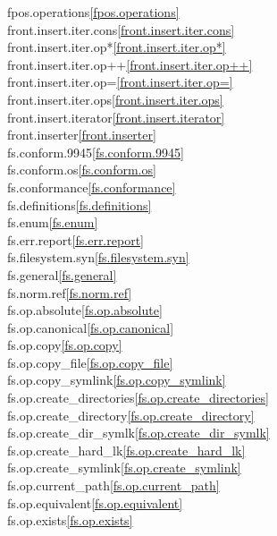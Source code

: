 \begin{multicols}{2}
fpos.operations\quad\ref{fpos.operations}\\
front.insert.iter.cons\quad\ref{front.insert.iter.cons}\\
front.insert.iter.op*\quad\ref{front.insert.iter.op*}\\
front.insert.iter.op++\quad\ref{front.insert.iter.op++}\\
front.insert.iter.op=\quad\ref{front.insert.iter.op=}\\
front.insert.iter.ops\quad\ref{front.insert.iter.ops}\\
front.insert.iterator\quad\ref{front.insert.iterator}\\
front.inserter\quad\ref{front.inserter}\\
fs.conform.9945\quad\ref{fs.conform.9945}\\
fs.conform.os\quad\ref{fs.conform.os}\\
fs.conformance\quad\ref{fs.conformance}\\
fs.definitions\quad\ref{fs.definitions}\\
fs.enum\quad\ref{fs.enum}\\
fs.err.report\quad\ref{fs.err.report}\\
fs.filesystem.syn\quad\ref{fs.filesystem.syn}\\
fs.general\quad\ref{fs.general}\\
fs.norm.ref\quad\ref{fs.norm.ref}\\
fs.op.absolute\quad\ref{fs.op.absolute}\\
fs.op.canonical\quad\ref{fs.op.canonical}\\
fs.op.copy\quad\ref{fs.op.copy}\\
fs.op.copy_file\quad\ref{fs.op.copy_file}\\
fs.op.copy_symlink\quad\ref{fs.op.copy_symlink}\\
fs.op.create_directories\quad\ref{fs.op.create_directories}\\
fs.op.create_directory\quad\ref{fs.op.create_directory}\\
fs.op.create_dir_symlk\quad\ref{fs.op.create_dir_symlk}\\
fs.op.create_hard_lk\quad\ref{fs.op.create_hard_lk}\\
fs.op.create_symlink\quad\ref{fs.op.create_symlink}\\
fs.op.current_path\quad\ref{fs.op.current_path}\\
fs.op.equivalent\quad\ref{fs.op.equivalent}\\
fs.op.exists\quad\ref{fs.op.exists}\\

\end{multicols}
